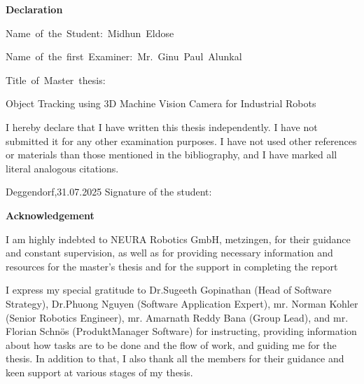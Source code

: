 \documentclass[12pt]{article}
\begin{document}
\linespread{1.5}

\textbf{Declaration}

\vspace{0.5cm}

\mbox{Name of the Student: Midhun Eldose}

\vspace{0.5cm}

\mbox{Name of the first Examiner:  Mr. Ginu Paul Alunkal }

\vspace{1 cm}

\mbox{Title of Master thesis:}

\vspace{0.5 cm}

Object Tracking using 3D Machine Vision Camera for Industrial Robots
\vspace{1.5 cm}

 I hereby declare that I have written this thesis independently. I have not submitted it for any other examination purposes. I have not used other references or materials than those mentioned in the bibliography, and I have marked all literal analogous citations.

 \vspace{1.5 cm}

Deggendorf,31.07.2025
\hspace{4 cm}
Signature of the student:


\linespread{1.5}
\newpage

\tableofcontents
\newpage
\listoffigures
{}
\newpage
\listoftables
{}
\newpage

\newpage

\begin{center}
    \textbf{Acknowledgement}
\end{center}
    

    I am highly indebted to NEURA Robotics GmbH, metzingen, for their guidance and constant supervision, as well as for providing necessary information and resources for the master's thesis and for the support in completing the report

    \vspace{1cm}
    
    I express my special gratitude to Dr.Sugeeth Gopinathan (Head of Software Strategy), Dr.Phuong Nguyen (Software Application Expert), mr. Norman Kohler (Senior Robotics Engineer), mr. Amarnath Reddy Bana (Group Lead), and mr. Florian Schnös (ProduktManager Software) for instructing, providing information about how tasks are to be done and the flow of work, and guiding me for the thesis. In addition to that, I also thank all the members for their guidance and keen support at various stages of my thesis.
\end{document}
